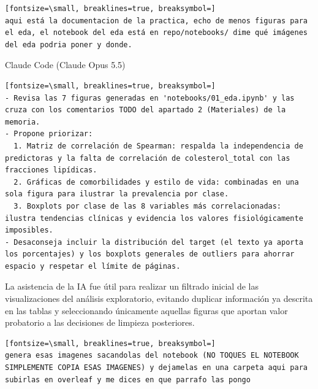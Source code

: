 \documentclass[12pt,a4paper,oneside]{book}
\begin{document}
\begin{iaprompt}
\begin{iaprompt}
\begin{Verbatim}[fontsize=\small, breaklines=true, breaksymbol=]
aqui está la documentacion de la practica, echo de menos figuras para el eda, el notebook del eda está en repo/notebooks/ dime qué imágenes del eda podria poner y donde.
\end{Verbatim}
\end{iaprompt}
\begin{iaresp}{Claude Code (Claude Opus 5.5)}
\begin{Verbatim}[fontsize=\small, breaklines=true, breaksymbol=]
- Revisa las 7 figuras generadas en 'notebooks/01_eda.ipynb' y las cruza con los comentarios TODO del apartado 2 (Materiales) de la memoria.
- Propone priorizar:
  1. Matriz de correlación de Spearman: respalda la independencia de predictoras y la falta de correlación de colesterol_total con las fracciones lipídicas.
  2. Gráficas de comorbilidades y estilo de vida: combinadas en una sola figura para ilustrar la prevalencia por clase.
  3. Boxplots por clase de las 8 variables más correlacionadas: ilustra tendencias clínicas y evidencia los valores fisiológicamente imposibles.
- Desaconseja incluir la distribución del target (el texto ya aporta los porcentajes) y los boxplots generales de outliers para ahorrar espacio y respetar el límite de páginas.
\end{Verbatim}
\end{iaresp}
\begin{iaanalisis}
La asistencia de la IA fue útil para realizar un filtrado inicial de las visualizaciones del análisis exploratorio, evitando duplicar información ya descrita en las tablas y seleccionando únicamente aquellas figuras que aportan valor probatorio a las decisiones de limpieza posteriores.
\end{iaanalisis}



\begin{iaprompt}
\begin{Verbatim}[fontsize=\small, breaklines=true, breaksymbol=]
genera esas imagenes sacandolas del notebook (NO TOQUES EL NOTEBOOK SIMPLEMENTE COPIA ESAS IMAGENES) y dejamelas en una carpeta aqui para subirlas en overleaf y me dices en que parrafo las pongo
\end{Verbatim}
\end{iaprompt}


\end{iaprompt}
\end{document}
